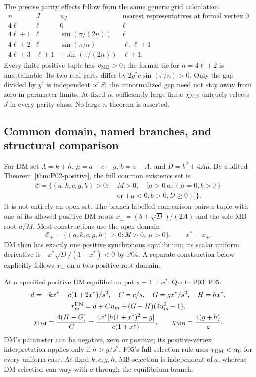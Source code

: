 The precise parity effects follow from the same generic grid calculation:
\[
\begin{array}{c|c|c|c}
n&J&u_J&\text{nearest representatives at formal vertex }0\\\hline
4\ell&\ell&0&\ell\\
4\ell+1&\ell&\sin(\pi/(2n))&\ell\\
4\ell+2&\ell&\sin(\pi/n)&\ell,\ell+1\\
4\ell+3&\ell+1&-\sin(\pi/(2n))&\ell+1.
\end{array}
\]
Every finite positive tuple has $v_{\mathrm{MB}}>0$; the formal tie for
$n=4\ell+2$ is unattainable. Its two real parts differ by
$2y^*c\sin(\pi/n)>0$. Only the gap divided by $y^*$ is independent
of $S$; the unnormalized gap need not stay away from zero in parameter
limits. At fixed $n$, sufficiently large finite $\chi_{\mathrm{MB}}$ uniquely
selects $J$ in every parity class. No large-$n$ theorem is asserted.

\subsection{Common domain, named branches, and structural comparison}
\label{slot:P08-5}
For DM set $A=k+h$, $\mu=a+c-g$, $b=a-A$, and $D=b^2+4A\mu$.
By audited Theorem~\ref{thm:P02-positive}, the full common existence set is
\begin{equation}
\begin{split}
 \mathcal C=\{(a,k,c,g,h)>0:\ &M>0,\quad
 [\mu>0\ \text{or}\ (\mu=0,b>0)\\
 &\text{or}\ (\mu<0,b>0,D\ge0)]\}.
\end{split}\label{eq:P08-common}
\end{equation}
It is not entirely an open set. The branch-labelled comparison pairs
a tuple with one of its allowed positive DM roots
$x_\pm=(b\pm\sqrt D)/(2A)$ and the sole MB root $a/M$.
Most constructions use the open domain
\begin{equation}
 \mathcal C_+=\{(a,k,c,g,h)>0:M>0,\ \mu>0\},\qquad x^*=x_+.
 \label{eq:P08-common-simple}
\end{equation}
DM then has exactly one positive synchronous equilibrium; its scalar
uniform derivative is $-x^*\sqrt D/(1+x^*)<0$ by P04. A separate
construction below explicitly follows $x_-$ on a two-positive-root domain.

At a specified positive DM equilibrium put $s=1+x^*$. Quote P03--P05:
\begin{equation}
\begin{gathered}
 d=-kx^*-c(1+2x^*)/s^2,\quad C=c/s,\quad G=gx^*/s^2,\quad H=hx^*,\\
 r_m^{\mathrm{DM}}=d+Cu_m+(G-H)(2u_m^2-1),\\
 \chi_{\mathrm{DM}}=\frac{4(H-G)}C
 =\frac{4x^*[h(1+x^*)^2-g]}{c(1+x^*)},\qquad
 \chi_{\mathrm{MB}}=\frac{4(g+h)}c.
\end{gathered}\label{eq:P08-DM-input}
\end{equation}
DM's parameter can be negative, zero or positive; its positive-vertex
interpretation applies only if $h>g/s^2$. P05's full selection rule uses
$\chi_{\mathrm{DM}}<\alpha_0$ for every uniform case. At fixed $k,c,g,h$,
MB selection is independent of $a$, whereas DM selection can vary with
$a$ through the equilibrium branch.

